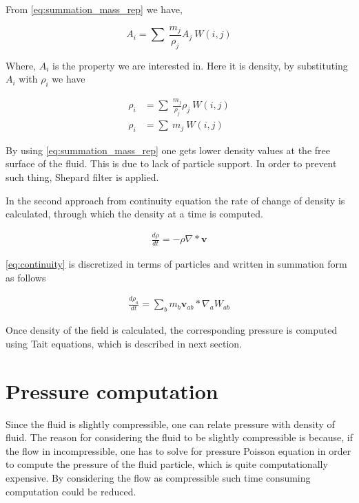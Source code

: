 From \eqref{eq:summation_mass_rep} we have,

\begin{equation*}
  \label{eq:summation_mass_rep}
  A_i = \sum\> \frac{m_j}{\rho_j} A_j\> W(i,j)
\end{equation*}

Where, $A_i$ is the property we are interested in. Here it is density,
by substituting $A_i$ with $\rho_i$ we have

\begin{align}
  \label{eq:summation_mass_rep}
    \rho_i &= \sum\> \frac{m_j}{\rho_j} \rho_j\> W(i,j) \nonumber \\
    \rho_i &= \sum\> m_j \> W(i,j)
\end{align}


By using \eqref{eq:summation_mass_rep} one gets lower density values
at the free surface of the fluid. This is due to lack of particle
support. In order to prevent such thing, Shepard filter is applied.

In the second approach from continuity equation the rate of change of
density is calculated, through which the density at a time is
computed.

\begin{align}
  \label{eq:continuity}
    \frac{d\rho}{dt} = -\rho \nabla * \textbf{v}
\end{align}

\eqref{eq:continuity} is discretized in terms of particles and written
in summation form as follows

\begin{align}
  \label{eq:sph_continuity}
    \frac{d\rho_a}{dt} = \sum_{b}m_b \textbf{v}_{ab} * \nabla_a W_{ab}
\end{align}

Once density of the field is calculated, the corresponding pressure is computed using
Tait equations, which is described in next section.


\section{Pressure computation}

Since the fluid is slightly compressible, one can relate pressure with density
of fluid. The reason for considering the fluid to be slightly compressible is because,
if the flow in incompressible, one has to solve for pressure Poisson equation in order to
compute the pressure of the fluid particle, which is quite computationally expensive.
By considering the flow as compressible such time consuming computation could be reduced.

